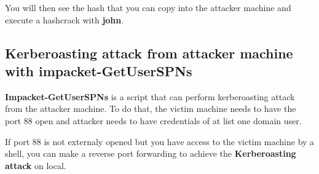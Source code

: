 \documentclass{assets/ipesethesis}
\begin{document}
You will then see the hash that you can copy into the attacker machine and execute a hashcrack with \textbf{john}.

\hypertarget{kerberoasting-attack-from-attacker-machine-with-impacket-getuserspns}{%
\subsection*{Kerberoasting attack from attacker machine with impacket-GetUserSPNs}\label{kerberoasting-attack-from-attacker-machine-with-impacket-getuserspns}}

\textbf{Impacket-GetUserSPNs} is a script that can perform kerberoasting attack from the attacker machine. To do that,
the victim machine needs to have the port 88 open and attacker needs to have credentials of at list one domain user.

If port 88 is not externaly opened but you have access to the victim machine by a shell, you can make a reverse port
forwarding to achieve the \textbf{Kerberoasting attack} on local.
\end{document}
